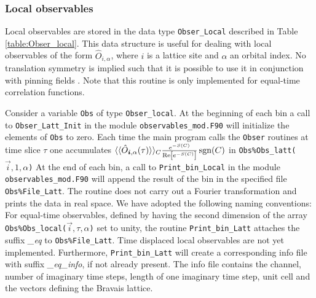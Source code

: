 \subsubsection{Local observables}
Local observables are stored in the data type \texttt{Obser\_Local} described in Table \ref{table:Obser_local}. This data structure is useful for dealing with local observables of the form  $\hat{O}_{i,\alpha} $, where $i$ is a lattice site and $\alpha$ an orbital index. No translation symmetry is  implied such that it is possible to use it in conjunction with pinning fields \cite{Assaad13}.   Note that this routine is only implemented for equal-time correlation functions.

Consider a variable  \texttt{Obs} of type  \texttt{Obser\_local}. At the beginning of each bin a call to  \texttt{Obser\_Latt\_Init} in the module \texttt{observables\_mod.F90}  will  initialize  the elements of \texttt{Obs} to zero.    Each time the main program calls the   \texttt{Obser} routines  at time slice $\tau$ one accumulates $ \langle \langle \hat{O}_{\boldsymbol{i},\alpha} (\tau)  \rangle \rangle_{C} \allowbreak \frac{e^{-S(C)}} {\operatorname{Re} \left[e^{-S(C)} \right]}  \operatorname{sgn}(C) $   in  \texttt{Obs\%Obs\_latt($\vec{i},1,\alpha$)}  
At the end of each bin, a call to \texttt{Print\_bin\_Local} in the module  \texttt{observables\_mod.F90}   will append the result of the bin in the specified  file \texttt{Obs\%File\_Latt}.  The routine does not carry out a Fourier transformation and prints the data in real space. 
We have adopted the following naming conventions:
For equal-time observables, defined by having the second dimension of the array  \texttt{Obs\%Obs\_local($\vec{i},\tau,\alpha$)}   set to unity, 
the routine \texttt{Print\_bin\_Latt}  attaches the suffix \emph{\_eq} to \texttt{Obs\%File\_Latt}.  Time displaced local observables are not yet implemented. 
Furthermore, \texttt{Print\_bin\_Latt} will create a corresponding info file with suffix \emph{\_eq\_info}, if not already present. The info file contains the channel, number of imaginary time steps, length of one imaginary time step, unit cell and the vectors defining the Bravais lattice.

